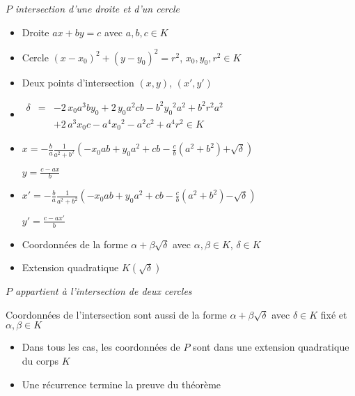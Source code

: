 \begin{frame}
 \emph{$P$ intersection d'une droite et d'un cercle} 

\pause
\begin{itemize}[<+->]
  \item Droite $ax+by=c$ avec $a,b,c \in K$
  \item Cercle $(x-x_0)^2+(y-y_0)^2=r^2$, $x_0,y_0,r^2 \in K$
  \item Deux points d'intersection $(x,y)$, $(x',y')$
  \item 
  $\begin{array}{rcl}
  \delta &=& -2\,x_{{0}}{a}^{3}by_{{0}}+2\,y_{{0}}{a}^{2}cb-{b}^{2}{y_{{0}}}^{2}{a}^{2}+{b}^
{2}{r}^{2}{a}^{2}\\
&&+2\,{a}^{3}x_{{0}}c-{a}^{4}{x_{{0}}}^{2}-{a}^{2}{c}^{
2}+{a}^{4}{r}^{2} \in K
\end{array}$
  \item $x =- \frac ba \frac{1}{a^2+b^2} \left(-x_{{0}}ab+y_{{0}}{a}^{2}+cb - \frac cb (a^2+b^2) \mathbf{+} \sqrt \delta \right)$
 
 $y = \frac{c-ax}{b}$
  
  \item $x' =- \frac ba \frac{1}{a^2+b^2} \left(-x_{{0}}ab+y_{{0}}{a}^{2}+cb - \frac cb (a^2+b^2) \mathbf{-} \sqrt \delta \right)$
  
  $y' = \frac{c-ax'}{b}$

  
  \item Coordonnées de la forme $\alpha+\beta\sqrt{\delta}$ avec $\alpha,\beta \in K$, $\delta \in K$
  \item Extension quadratique $K(\sqrt \delta)$
\end{itemize}
\end{frame}


\begin{frame}  
 \emph{$P$ appartient à l'intersection de deux cercles}

\pause
Coordonnées de l'intersection sont aussi de la forme $\alpha+\beta\sqrt\delta$ avec
$\delta \in K$ fixé et $\alpha,\beta\in K$

\bigskip
\pause

\begin{itemize}
  \item Dans tous les cas, les coordonnées de $P$ sont dans une extension quadratique du corps $K$
 
  \item Une récurrence termine la preuve du théorème
\end{itemize}

\end{frame}




